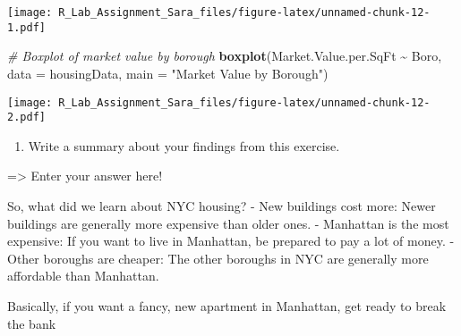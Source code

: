 \documentclass[
]{article}
\newenvironment{Shaded}{\begin{snugshade}}{\end{snugshade}}
\newcommand{\AttributeTok}[1]{\textcolor[rgb]{0.13,0.29,0.53}{#1}}
\newcommand{\CommentTok}[1]{\textcolor[rgb]{0.56,0.35,0.01}{\textit{#1}}}
\newcommand{\FunctionTok}[1]{\textcolor[rgb]{0.13,0.29,0.53}{\textbf{#1}}}
\newcommand{\NormalTok}[1]{#1}
\newcommand{\SpecialCharTok}[1]{\textcolor[rgb]{0.81,0.36,0.00}{\textbf{#1}}}
\newcommand{\StringTok}[1]{\textcolor[rgb]{0.31,0.60,0.02}{#1}}
\providecommand{\tightlist}{%
  \setlength{\itemsep}{0pt}\setlength{\parskip}{0pt}}
\begin{document}
\texttt{[image: R\_Lab\_Assignment\_Sara\_files/figure-latex/unnamed-chunk-12-1.pdf]}

\begin{Shaded}
\begin{Highlighting}[]
\CommentTok{\# Boxplot of market value by borough}
\FunctionTok{boxplot}\NormalTok{(Market.Value.per.SqFt }\SpecialCharTok{\textasciitilde{}}\NormalTok{ Boro, }\AttributeTok{data =}\NormalTok{ housingData,}
        \AttributeTok{main =} \StringTok{"Market Value by Borough"}\NormalTok{)}
\end{Highlighting}
\end{Shaded}

\texttt{[image: R\_Lab\_Assignment\_Sara\_files/figure-latex/unnamed-chunk-12-2.pdf]}

\begin{enumerate}
\def\labelenumi{\alph{enumi}.}
\setcounter{enumi}{2}
\tightlist
\item
  Write a summary about your findings from this exercise.
\end{enumerate}

=\textgreater{} Enter your answer here!

So, what did we learn about NYC housing? - New buildings cost more:
Newer buildings are generally more expensive than older ones. -
Manhattan is the most expensive: If you want to live in Manhattan, be
prepared to pay a lot of money. - Other boroughs are cheaper: The other
boroughs in NYC are generally more affordable than Manhattan.

Basically, if you want a fancy, new apartment in Manhattan, get ready to
break the bank
\end{document}
